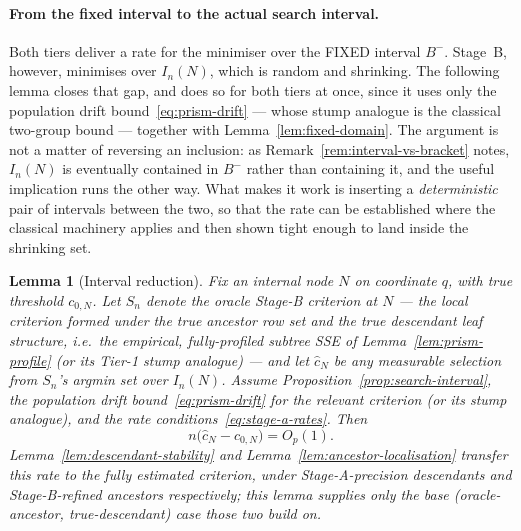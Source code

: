 \documentclass[11pt]{article}
\theoremstyle{plain}
\newtheorem{lemma}[theorem]{Lemma}
\theoremstyle{definition}
\theoremstyle{remark}
\begin{document}
\paragraph{From the fixed interval to the actual search interval.}
Both tiers deliver a rate for the minimiser over the FIXED interval \(B^-\).
Stage~B, however, minimises over \(I_n(N)\), which is random and shrinking.
The following lemma closes that gap, and does so for both tiers at once, since
it uses only the population drift bound~\eqref{eq:prism-drift} --- whose stump
analogue is the classical two-group bound --- together with
Lemma~\ref{lem:fixed-domain}. The argument is not a matter of reversing
an inclusion: as Remark~\ref{rem:interval-vs-bracket} notes, \(I_n(N)\) is
eventually contained in \(B^-\) rather than containing it, and the useful
implication runs the other way. What makes it work is inserting a
\emph{deterministic} pair of intervals between the two, so that the rate can
be established where the classical machinery applies and then shown tight
enough to land inside the shrinking set.

\begin{lemma}[Interval reduction]\label{lem:interval-reduction}
Fix an internal node \(N\) on coordinate \(q\), with true threshold
\(c_{0,N}\). Let \(S_n\) denote the \emph{oracle} Stage-B criterion at \(N\)
--- the local criterion formed under the true ancestor row set and the true
descendant leaf structure, i.e.\ the empirical, fully-profiled subtree SSE of
Lemma~\ref{lem:prism-profile} (or its Tier-1 stump analogue) --- and let
\(\hat c_N\) be \emph{any} measurable selection from \(S_n\)'s argmin set over
\(I_n(N)\). Assume Proposition~\ref{prop:search-interval}, the population
drift bound~\eqref{eq:prism-drift} for the relevant criterion (or its stump
analogue), and the rate conditions~\eqref{eq:stage-a-rates}. Then
\[
  n\bigl(\hat c_N-c_{0,N}\bigr)=O_p(1).
\]
Lemma~\ref{lem:descendant-stability} and Lemma~\ref{lem:ancestor-localisation}
transfer this rate to the fully estimated criterion, under Stage-A-precision
descendants and Stage-B-refined ancestors respectively; this lemma supplies
only the base (oracle-ancestor, true-descendant) case those two build on.
\end{lemma}
\end{document}
